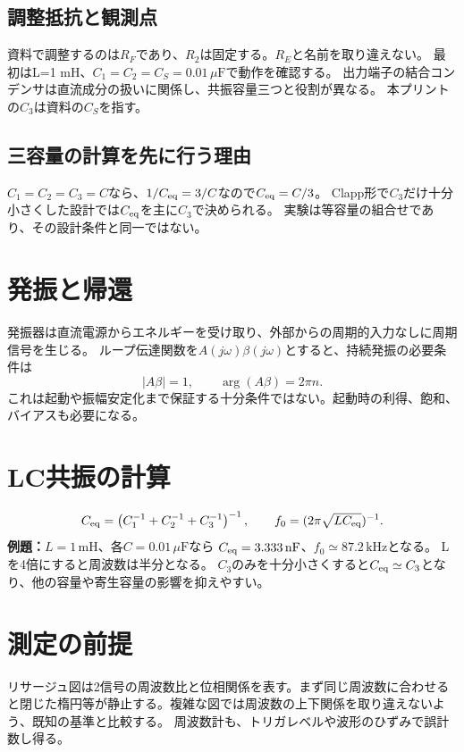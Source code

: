 \documentclass[lualatex,a4paper,10pt]{jlreq}
\begin{document}
\subsection{調整抵抗と観測点}
資料で調整するのは$R_F$であり、$R_2$は固定する。$R_E$と名前を取り違えない。
最初はL=1 mH、$C_1=C_2=C_S=0.01\,\mu\mathrm{F}$で動作を確認する。
出力端子の結合コンデンサは直流成分の扱いに関係し、共振容量三つと役割が異なる。
本プリントの$C_3$は資料の$C_S$を指す。
\subsection{三容量の計算を先に行う理由}
$C_1=C_2=C_3=C$なら、$1/C_{\rm eq}=3/C$なので$C_{\rm eq}=C/3$。
Clapp形で$C_3$だけ十分小さくした設計では$C_{\rm eq}$を主に$C_3$で決められる。
実験は等容量の組合せであり、その設計条件と同一ではない。

\section{発振と帰還}\label{sec:auto3}
発振器は直流電源からエネルギーを受け取り、外部からの周期的入力なしに周期信号を生じる。
ループ伝達関数を$A(j\omega)\beta(j\omega)$とすると、持続発振の必要条件は
\[
 |A\beta|=1,\qquad \arg(A\beta)=2\pi n.
\]
これは起動や振幅安定化まで保証する十分条件ではない。起動時の利得、飽和、バイアスも必要になる。
\section{LC共振の計算}\label{sec:auto4}
\[
 C_{\rm eq}=\left(C_1^{-1}+C_2^{-1}+C_3^{-1}\right)^{-1},
 \qquad f_0=(2\pi\sqrt{LC_{\rm eq}})^{-1}.
\]
\textbf{例題：}$L=1\,\mathrm{mH}$、各$C=0.01\,\mu\mathrm{F}$なら
$C_{\rm eq}=3.333\,\mathrm{nF}$、$f_0\simeq87.2\,\mathrm{kHz}$となる。
Lを4倍にすると周波数は半分となる。
$C_3$のみを十分小さくすると$C_{\rm eq}\simeq C_3$となり、他の容量や寄生容量の影響を抑えやすい。
\clearpage
\section{測定の前提}\label{sec:auto5}
リサージュ図は2信号の周波数比と位相関係を表す。まず同じ周波数に合わせると閉じた楕円等が静止する。複雑な図では周波数の上下関係を取り違えないよう、既知の基準と比較する。
周波数計も、トリガレベルや波形のひずみで誤計数し得る。
\end{document}

